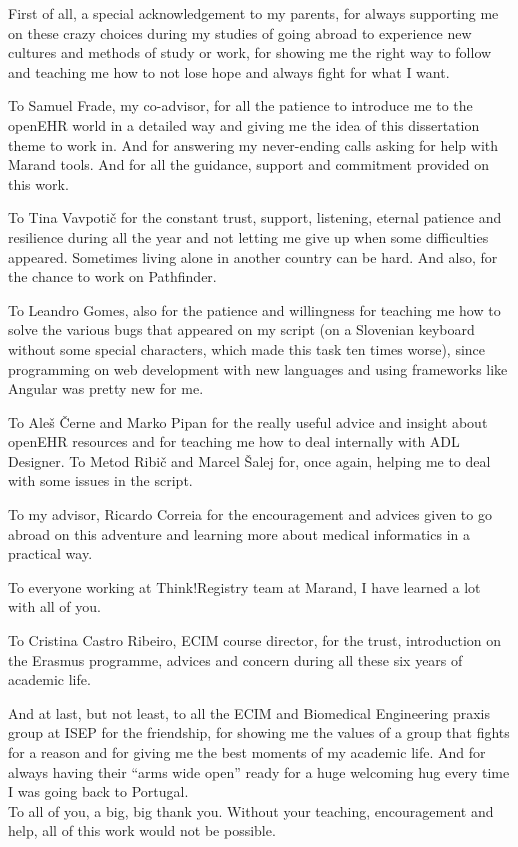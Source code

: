 \documentclass[mim_thesis.tex]{subfiles}
\begin{document}
First of all, a special acknowledgement to my parents, for always supporting me on these crazy choices during my studies of going abroad to experience new cultures and methods of study or work, for showing me the right way to follow and teaching me how to not lose hope and always fight for what I want.

To Samuel Frade, my co-advisor, for all the patience to introduce me to the openEHR world in a detailed way and giving me the idea of this dissertation theme to work in. And for answering my never-ending calls asking for help with Marand tools. And for all the guidance, support and commitment provided on this work. 

To Tina Vavpotič for the constant trust, support, listening, eternal patience and resilience during all the year and not letting me give up when some difficulties appeared. Sometimes living alone in another country can be hard. And also, for the chance to work on Pathfinder.  

To Leandro Gomes, also for the patience and willingness for teaching me how to solve the various bugs that appeared on my script (on a Slovenian keyboard without some special characters, which made this task ten times worse), since programming on web development with new languages and using frameworks like Angular was pretty new for me.

To Aleš Černe and Marko Pipan for the really useful advice and insight about openEHR resources and for teaching me how to deal internally with ADL Designer. To Metod Ribič and Marcel Šalej for, once again, helping me to deal with some issues in the script.

To my advisor, Ricardo Correia for the encouragement and advices given to go abroad on this adventure and learning more about medical informatics in a practical way.

To everyone working at Think!Registry team at Marand, I have learned a lot with all of you.

To Cristina Castro Ribeiro, ECIM course director, for the trust, introduction on the Erasmus programme, advices and concern during all these six years of academic life. 

And at last, but not least, to all the ECIM and Biomedical Engineering praxis group at ISEP for the friendship, for showing me the values of a group that fights for a reason and for giving me the best moments of my academic life. And for always having their “arms wide open” ready for a huge welcoming hug every time I was going back to Portugal.\\

To all of you, a big, big thank you. Without your teaching, encouragement and help, all of this work would not be possible.
\end{document}
